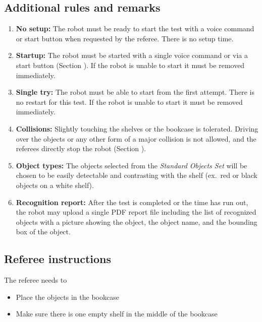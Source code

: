 \subsection{Additional rules and remarks}
\begin{enumerate}
\item \textbf{No setup:} The robot must be ready to start the test with a voice command or start button when requested by the referee. There is no setup time.
\item \textbf{Startup:} The robot must be started with a single voice command or via a start button (Section ). If the robot is unable to start it must be removed immediately.
\item \textbf{Single try:} The robot must be able to start from the first attempt. There is no restart for this test. If the robot is unable to start it must be removed immediately.
\item \textbf{Collisions:} Slightly touching the shelves or the bookcase is tolerated. Driving over the objects or any other form of a major collision is not allowed, and the referees directly stop the robot (Section ).
\item \textbf{Object types:} The objects selected from the \textit{Standard Objects Set} will be chosen to be easily detectable and contrasting with the shelf (ex.~red or black objects on a white shelf).
\item \textbf{Recognition report:} After the test is completed or the time has run out, the robot may upload a single PDF report file including the list of recognized objects with a picture showing the object, the object name, and the bounding box of the object.
\end{enumerate}

\subsection{Referee instructions}

The referee needs to
\begin{itemize}
\item Place the objects in the bookcase
\item Make sure there is one empty shelf in the middle of the bookcase
\end{itemize}

